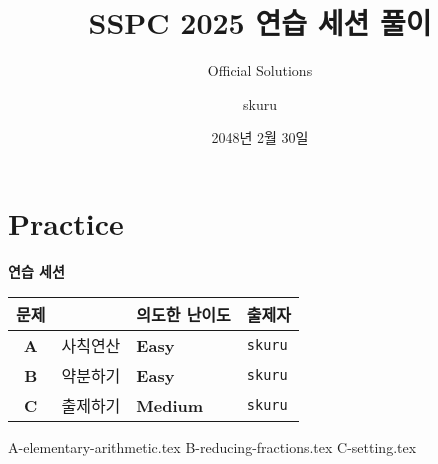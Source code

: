 
\usetikzlibrary{arrows.meta,matrix,decorations.pathreplacing}

\title{SSPC 2025 연습 세션 풀이}
\subtitle{Official Solutions}
\author{skuru}
\date{2048년 2월 30일}


\setcounter{framenumber}{-1}
\frame{\titlepage}

\section{Practice}
\begin{frame}
    {\huge {} \color{main-color} \textbf{연습 세션}}
    \vspace{3mm}
    \begin{center}
        \begin{tabular}{cl|l|l}
            \hline
            문제         &      & 의도한 난이도                         & 출제자            \\
            \hline
            \hline
            \textbf{A} & 사칙연산 & \textbf{\color{acbronze}Easy}   & \texttt{skuru} \\
            \textbf{B} & 약분하기 & \textbf{\color{acbronze}Easy}   & \texttt{skuru} \\
            \textbf{C} & 출제하기 & \textbf{\color{acgold}Medium} & \texttt{skuru} \\
            \hline
        \end{tabular}
    \end{center}
\end{frame}

{A-elementary-arithmetic.tex}
{B-reducing-fractions.tex}
{C-setting.tex}

